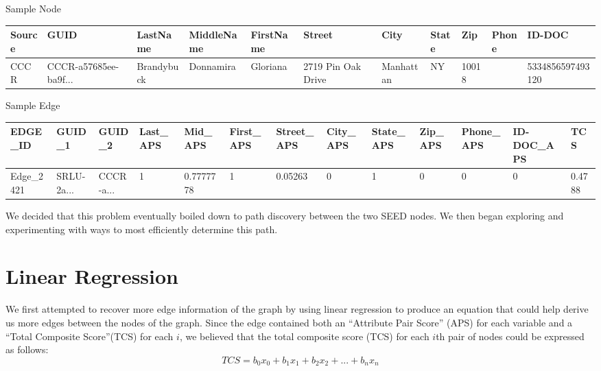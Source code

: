 \documentclass{article} %
\begin{document}


Sample Node


\begin{table}[h]
\centering
\tiny
\begin{tabular}{|l|l|l|l|l|l|l|l|l|l|l|}
\hline
\textbf{Source} & \textbf{GUID} & \textbf{LastName} & \textbf{MiddleName} & \textbf{FirstName} & \textbf{Street} & \textbf{City} & \textbf{State} & \textbf{Zip} & \textbf{Phone} & \textbf{ID-DOC} \\ \hline
CCCR & CCCR-a57685ee-ba9f... & Brandybuck & Donnamira & Gloriana & 2719 Pin Oak Drive & Manhattan & NY & 10018 &  & 5334856597493120 \\ \hline
\end{tabular}
\end{table}


Sample Edge

\begin{table}[h]
\tiny
\begin{tabular}{|l|l|l|l|l|l|l|l|l|l|l|l|l|}
\hline
\textbf{EDGE\_ID} & \textbf{GUID\_1} & \textbf{GUID\_2} & \textbf{Last\_APS} & \textbf{Mid\_APS} & \textbf{First\_APS} & \textbf{Street\_APS} & \textbf{City\_APS} & \textbf{State\_APS} & \textbf{Zip\_APS} & \textbf{Phone\_APS} & \textbf{ID-DOC\_APS} & \textbf{TCS} \\ \hline
Edge\_2421 & SRLU-2a... & CCCR-a... & 1 & 0.7777778 & 1 & 0.05263 & 0 & 1 & 0 & 0 & 0 & 0.4788 \\ \hline
\end{tabular}
\end{table}

We decided that this problem eventually boiled down to path discovery between the two SEED nodes. We then began exploring and experimenting with ways to most efficiently determine this path.

\section{Linear Regression}

We first attempted to recover more edge information of the graph by using linear regression to produce an equation that could help derive us more edges between the nodes of the graph. Since the edge contained both an ``Attribute Pair Score'' (APS) for each variable and a ``Total Composite Score''(TCS) for each $i$, we believed that the total composite score (TCS) for each $i$th pair of nodes could be expressed as follows:
\[
TCS = b_0x_0 + b_1x_1 + b_2x_2 + ... + b_nx_n
\]
\end{document}

